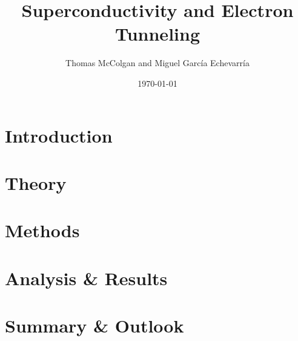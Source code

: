 \documentclass[8pt]{beamer}
\title{\textbf{Superconductivity and Electron Tunneling}}
\author{Thomas McColgan and Miguel Garc\'ia Echevarr\'ia}
\date{\today}
\begin{document}
\frame{\titlepage}

\section{Introduction}


\section{Theory}


\section{Methods}


\section{Analysis \& Results}


\section{Summary \& Outlook}

\end{document}
